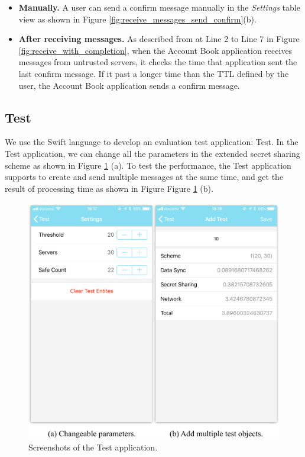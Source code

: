 \documentclass[a4paper,11pt]{report}
\begin{document}
\begin{itemize}
\begin{itemize}[leftmargin=7mm]
	\setlength{\itemsep}{1pt}
	\setlength{\parskip}{0pt}
	\setlength{\parsep}{0pt}
	\item \textbf{Manually.}
	A user can send a confirm message manually in the \emph{Settings} table view as shown in Figure \ref{fig:receive_messages_send_confirm}(b).
	\item \textbf{After receiving messages.}
	As described from at Line 2 to Line 7 in Figure \ref{fig:receive_with_completion}, when the Account Book application receives messages from untrusted servers, it checks the time that application sent the last confirm message.
	If it past a longer time than the TTL defined by the user, the Account Book application sends a confirm message.
\end{itemize}

\end{itemize}

\subsection{Test}

We use the Swift language to develop an evaluation test application: Test.
In the Test application, we can change all the parameters in the extended secret sharing scheme as shown in Figure \ref{fig:test} (a).
To test the performance, the Test application supports to create and send multiple messages at the same time, and get the result of processing time as shown in Figure Figure \ref{fig:test} (b).

\begin{figure}[t]
	\centering
	\includegraphics[scale=0.7]{test}
	\caption{Screenshots of the Test application.}
	\label{fig:test}
\end{figure}
\end{document}
